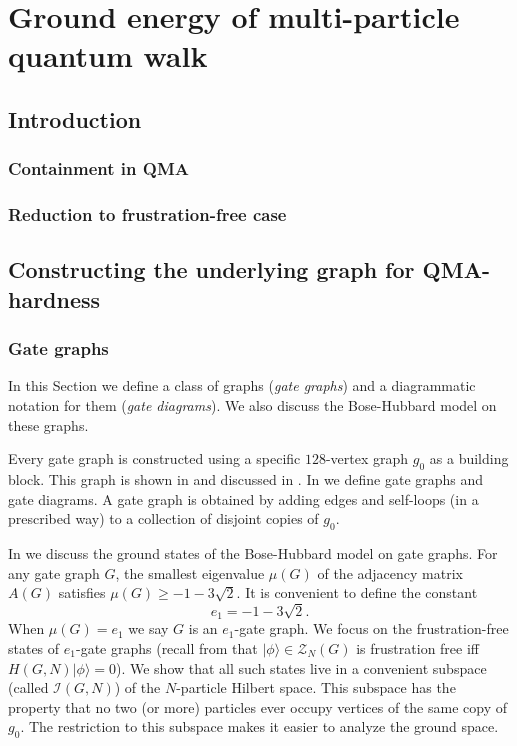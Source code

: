 \documentclass[../thesis-main/thesis-main]{subfiles}
\begin{document}
\chapter{Ground energy of multi-particle quantum walk}

\section{Introduction}
\subsection{Containment in QMA}
\subsection{Reduction to frustration-free case}


\section{Constructing the underlying graph for QMA-hardness}

\subsection{Gate graphs}

In this Section we define a class of graphs (\emph{gate graphs}) and a diagrammatic notation for them (\emph{gate diagrams}). We also discuss the Bose-Hubbard model on these graphs.

Every gate graph is constructed using a specific $128$-vertex graph $g_{0}$ as a building block. This graph is shown in  and discussed in . In  we define gate graphs and gate diagrams. A gate graph is obtained by adding edges and self-loops (in a prescribed way) to a collection of disjoint copies of $g_{0}$.

In  we discuss the ground states of the Bose-Hubbard model on gate graphs. For any gate graph $G$, the smallest eigenvalue $\mu(G)$ of the adjacency matrix $A(G)$ satisfies $\mu(G)\geq-1-3\sqrt{2}$. It is convenient to define the constant
\begin{equation}
e_{1}=-1-3\sqrt{2}.\label{eq:e1_defn}
\end{equation}
When $\mu(G)=e_{1}$ we say $G$ is an $e_{1}$-gate graph. We focus on the frustration-free states of $e_1$-gate graphs (recall from  that $|\phi\rangle\in \mathcal{Z}_N(G)$ is frustration free iff $H(G,N)|\phi\rangle=0$). We show that all such states live in a convenient subspace (called $\mathcal{I}(G,N)$) of the $N$-particle Hilbert space. This subspace has the property that no two (or more) particles ever occupy vertices of the same copy of $g_{0}$. The restriction to this subspace makes it easier to analyze the ground space.
\end{document}
